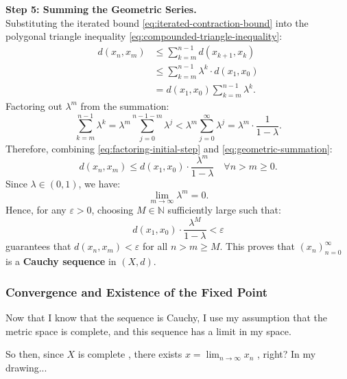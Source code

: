 \begin{proofWrapper}
\begin{content}
\textbf{Step 5: Summing the Geometric Series.} \\
Substituting the iterated bound \eqref{eq:iterated-contraction-bound} into the polygonal triangle inequality \eqref{eq:compounded-triangle-inequality}:
\begin{align}
d(x_n, x_m) &\le \sum_{k=m}^{n-1} d(x_{k+1}, x_k) \nonumber \\
&\le \sum_{k=m}^{n-1} \lambda^k \cdot d(x_1, x_0) \nonumber \\
&= d(x_1, x_0) \sum_{k=m}^{n-1} \lambda^k. \label{eq:factoring-initial-step}
\end{align}
Factoring out $\lambda^m$ from the summation:
\begin{equation}\label{eq:geometric-summation}
\sum_{k=m}^{n-1} \lambda^k = \lambda^m \sum_{j=0}^{n-1-m} \lambda^j < \lambda^m \sum_{j=0}^\infty \lambda^j = \lambda^m \cdot \frac{1}{1 - \lambda}.
\end{equation}
Therefore, combining \eqref{eq:factoring-initial-step} and \eqref{eq:geometric-summation}:
\begin{equation}\label{eq:cauchy-uniform-bound}
d(x_n, x_m) \le d(x_1, x_0) \cdot \frac{\lambda^m}{1 - \lambda} \quad \forall n > m \ge 0.
\end{equation}
Since $\lambda \in (0, 1)$, we have:
\begin{equation}\label{eq:lambda-m-vanishes}
\lim_{m \to \infty} \lambda^m = 0.
\end{equation}
Hence, for any $\varepsilon > 0$, choosing $M \in \mathbb{N}$ sufficiently large such that:
\[
d(x_1, x_0) \cdot \frac{\lambda^M}{1 - \lambda} < \varepsilon
\]
guarantees that $d(x_n, x_m) < \varepsilon$ for all $n > m \ge M$. This proves that $(x_n)_{n=0}^\infty$ is a \textbf{Cauchy sequence} in $(X, d)$.
\end{content}

\subsubsection{Convergence and Existence of the Fixed Point}

\begin{speech}[00:35:47 - 00:36:41]
Now that I know that the sequence is Cauchy, I use my assumption that the metric space is complete, and this sequence has a limit in my space.

So then, since $X$ is complete , there exists $x = \lim_{n \to \infty} x_n$ , right? In my drawing...


\end{speech}
\end{proofWrapper}
